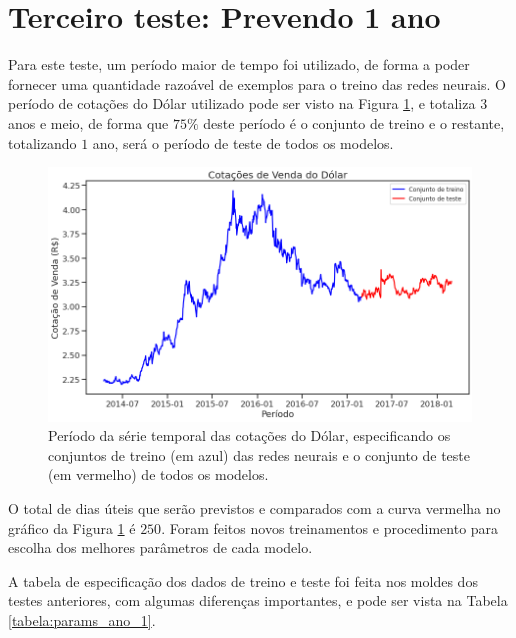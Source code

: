 \section{Terceiro teste: Prevendo 1 ano}

Para este teste, um período maior de tempo foi utilizado, de forma a poder fornecer uma quantidade razoável de exemplos para o treino das redes neurais. O período de cotações do Dólar utilizado pode ser visto na Figura \ref{fig:keras_treino_ano}, e totaliza $3$ anos e meio, de forma que $75\%$ deste período é o conjunto de treino e o restante, totalizando $1$ ano, será o período de teste de todos os modelos.

\begin{figure}[htb]
\centering
\includegraphics[width=14cm]{figuras/keras_treino_ano}
\caption{Período da série temporal das cotações do Dólar, especificando os conjuntos de treino (em azul) das redes neurais e o conjunto de teste (em vermelho) de todos os modelos.}
\label{fig:keras_treino_ano}
\end{figure}

O total de dias úteis que serão previstos e comparados com a curva vermelha no gráfico da Figura \ref{fig:keras_treino_ano} é $250$. Foram feitos novos treinamentos e procedimento para escolha dos melhores parâmetros de cada modelo.

A tabela de especificação dos dados de treino e teste foi feita nos moldes dos testes anteriores, com algumas diferenças importantes, e pode ser vista na Tabela \ref{tabela:params_ano_1}.

